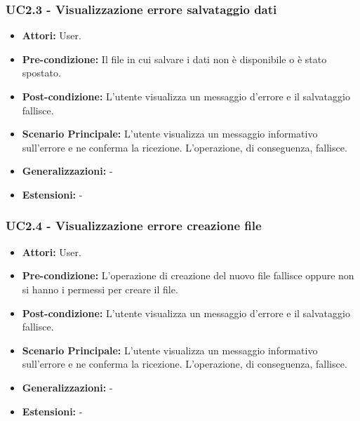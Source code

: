 \subsubsection{UC2.3 - Visualizzazione errore salvataggio dati}
\begin{itemize}
    \item \textbf{Attori:} User.
    \item \textbf{Pre-condizione:}  Il file in cui salvare i dati non è disponibile o è stato spostato. 
    \item \textbf{Post-condizione:} L'utente visualizza un messaggio d'errore e il salvataggio fallisce.
    \item \textbf{Scenario Principale:}  L'utente visualizza un messaggio informativo sull'errore e ne conferma la ricezione. L'operazione, di conseguenza, fallisce.
    \item \textbf{Generalizzazioni:} -
    \item \textbf{Estensioni:} -
\end{itemize}


\subsubsection{UC2.4 - Visualizzazione errore creazione file}
\begin{itemize}
    \item \textbf{Attori:} User.
    \item \textbf{Pre-condizione:} L'operazione di creazione del nuovo file fallisce oppure non si hanno i permessi per creare il file.
    \item \textbf{Post-condizione:} L'utente visualizza un messaggio d'errore e il salvataggio fallisce.
    \item \textbf{Scenario Principale:} L'utente visualizza un messaggio informativo sull'errore e ne conferma la ricezione. L'operazione, di conseguenza, fallisce.
    \item \textbf{Generalizzazioni:} -
    \item \textbf{Estensioni:} -
\end{itemize}